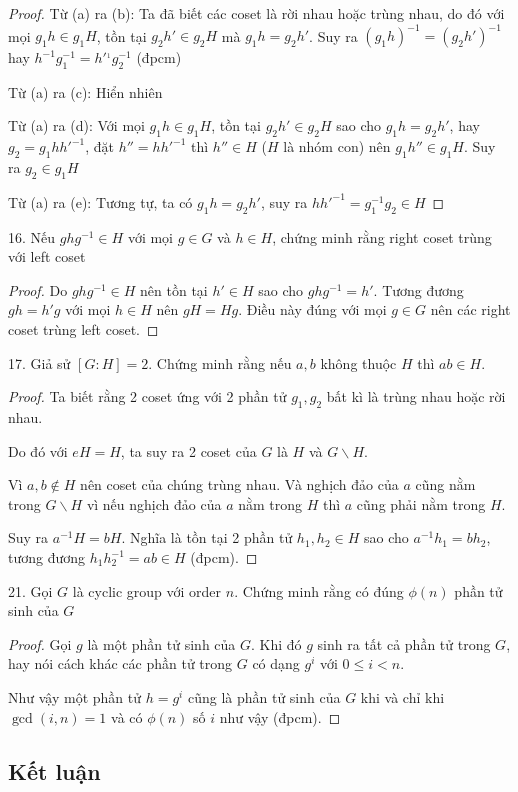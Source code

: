 \begin{proof}
    Từ (a) ra (b): Ta đã biết các coset là rời nhau hoặc trùng nhau, do đó với mọi $g_1 h \in g_1 H$, tồn tại $g_2 h' \in g_2 H$ mà $g_1 h = g_2 h'$. Suy ra $(g_1 h)^{-1} = (g_2 h')^{-1}$ hay $h^{-1} g_1^{-1} = h'^{_1} g_2^{-1}$ (đpcm)

    Từ (a) ra (c): Hiển nhiên

    Từ (a) ra (d): Với mọi $g_1 h \in g_1 H$, tồn tại $g_2 h' \in g_2 H$ sao cho $g_1 h = g_2 h'$, hay $g_2 = g_1 h h'^{-1}$, đặt $h'' = h h'^{-1}$ thì $h'' \in H$ ($H$ là nhóm con) nên $g_1 h'' \in g_1 H$. Suy ra $g_2 \in g_1 H$

    Từ (a) ra (e): Tương tự, ta có $g_1 h = g_2 h'$, suy ra $h h'^{-1}= g_1^{-1} g_2 \in H$

\end{proof}


16. Nếu $g h g^{-1} \in H$ với mọi $g \in G$ và $h \in H$, chứng minh rằng right coset trùng với left coset

\begin{proof}
    Do $g h g^{-1} \in H$ nên tồn tại $h' \in H$ sao cho $g h g^{-1} = h'$. Tương đương $g h = h' g$ với mọi $h \in H$ nên $g H = H g$. Điều này đúng với mọi $g \in G$ nên các right coset trùng left coset.
\end{proof}

17. Giả sử $[G:H]=2$. Chứng minh rằng nếu $a, b$ không thuộc $H$ thì $ab \in H$.

\begin{proof}
    Ta biết rằng 2 coset ứng với 2 phần tử $g_1, g_2$ bất kì là trùng nhau hoặc rời nhau.

    Do đó với $eH = H$, ta suy ra 2 coset của $G$ là $H$ và $G \backslash H$.

    Vì $a, b \not\in H$ nên coset của chúng trùng nhau. Và nghịch đảo của $a$ cũng nằm trong $G \backslash H$ vì nếu nghịch đảo của $a$ nằm trong $H$ thì $a$ cũng phải nằm trong $H$.

    Suy ra $a^{-1} H = b H$. Nghĩa là tồn tại 2 phần tử $h_1, h_2 \in H$ sao cho $a^{-1} h_1 = b h_2$, tương đương $h_1 h_2^{-1} = a b \in H$ (đpcm).
\end{proof}

21. Gọi $G$ là cyclic group với order $n$. Chứng minh rằng có đúng $\phi(n)$ phần tử sinh của $G$

\begin{proof}
    Gọi $g$ là một phần tử sinh của $G$. Khi đó $g$ sinh ra tất cả phần tử trong $G$, hay nói cách khác các phần tử trong $G$ có dạng $g^i$ với $0 \leq i < n$.

    Như vậy một phần tử $h = g^i$ cũng là phần tử sinh của $G$ khi và chỉ khi $\gcd(i, n) = 1$ và có $\phi(n)$ số $i$ như vậy (đpcm).

\end{proof}

\subsection*{Kết luận}
